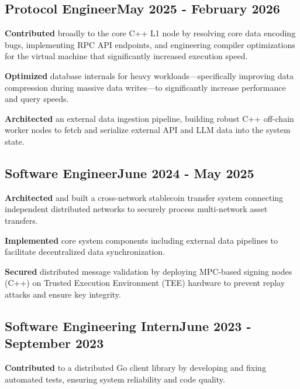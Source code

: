 \documentclass[a4paper,12pt]{article}
\begin{document}
\vspace*{6pt}
\subsection{{Protocol Engineer}\hfill May 2025 - February 2026}
\begin{zitemize}
    \item \textbf{Contributed} broadly to the core C++ L1 node by resolving core data encoding bugs, implementing RPC API endpoints, and engineering compiler optimizations for the virtual machine that significantly increased execution speed.
    \item \textbf{Optimized} database internals for heavy workloads—specifically improving data compression during massive data writes—to significantly increase performance and query speeds.
    \item \textbf{Architected} an external data ingestion pipeline, building robust C++ off-chain worker nodes to fetch and serialize external API and LLM data into the system state.
\end{zitemize}

\vspace*{6pt}
\subsection{{Software Engineer}\hfill June 2024 - May 2025}
\begin{zitemize}
    \item \textbf{Architected} and built a cross-network stablecoin transfer system connecting independent distributed networks to securely process multi-network asset transfers.
    \item \textbf{Implemented} core system components including external data pipelines to facilitate decentralized data synchronization.
    \item \textbf{Secured} distributed message validation by deploying MPC-based signing nodes (C++) on Trusted Execution Environment (TEE) hardware to prevent replay attacks and ensure key integrity.
\end{zitemize}

\vspace*{3pt}
\subsection{{Software Engineering Intern}\hfill June 2023 - September 2023}
\begin{zitemize}
    \item \textbf{Contributed} to a distributed Go client library by developing and fixing automated tests, ensuring system reliability and code quality.
\end{zitemize}
\end{document}
